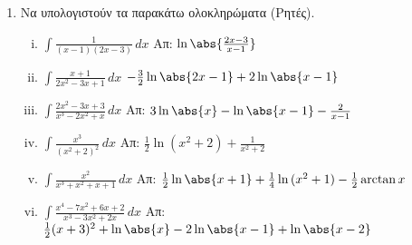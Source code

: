 \begin{enumerate}
	\item Να υπολογιστούν τα παρακάτω ολοκληρώματα (Ρητές).

		\begin{enumerate}[i)]
			\item $ \int \frac{1}{(x-1)(2x-3)} \,{dx} $ \hfill Απ: $
				\ln{\abs{\frac{2x-3}{x-1}}}$
			\item $ \int \frac{x+1}{2x^{2} - 3x + 1} \,{dx} $ \hfill $
				-\frac{3}{2} \ln{\abs{2x-1}} + 2 \ln{\abs{x-1}}$
			\item $ \int \frac{2x^{2} - 3x + 3}{x^{3} - 2x^{2} + x}  \,{dx}  $  \hfill Απ: $
        3 \ln{\abs{x}} - \ln{\abs{x-1}} - \frac{2}{x-1} $
			\item $ \int \frac{x^{3}}{(x^{2} + 2)^{2}} \,{dx} $ \hfill Απ: $
				\frac{1}{2} \ln{(x^{2} + 2)} + \frac{1}{x^{2} + 2} $ 
			\item $ \int \frac{x^{2}}{x^{3} + x^{2} + x +1} \,{dx} $ \hfill Απ:
				$ \frac{1}{2} \ln{\abs{x+1}} + \frac{1}{4} \ln{(x^{2} + 1)} -
				\frac{1}{2} \arctan x$
			\item $ \int \frac{x^{4}-7x^{2}+6x+2}{x^{3}-3x^{2}+2x} \,{dx} $
				\hfill Απ: $ \frac{1}{2} (x+3)^{2} + \ln{\abs{x}} -2 \ln{\abs{x-1}}
				+ \ln{\abs{x-2}}$
		\end{enumerate}



\end{enumerate}


